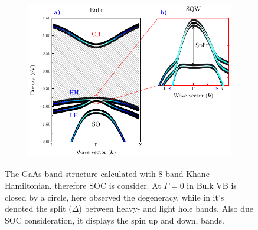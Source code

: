 \begin{figure}[h!]
	\centering
	\begin{subfigure}{\textwidth}
		\includegraphics[width=\linewidth]{../figures/chapter-2/numerical-calculations/out/kp-bands}
		\label{subfig:chapter-2-sec-numerical-calculations-kp-bands-bulk-a}
		\label{subfig:chapter-2-sec-numerical-calculations-kp-bands-sqw-b}
	\end{subfigure}
	\caption[ The GaAs band structure calculated with 8-band Khane Hamiltonian\cite{kane1957bandstructure,novik2005bandstructure}]
	{
	 The GaAs band structure calculated with 8-band Khane Hamiltonian\cite{kane1957bandstructure,novik2005bandstructure}, therefore SOC is consider. At $\Gamma = 0$ in Bulk VB is closed by a circle, here observed the degeneracy, while in  it's denoted the split ($\Delta$) between heavy- and light hole bands. Also due SOC consideration, it displays the spin up and down, bands. 
	}\label{fig:chapter-2-sec-numerical-calculations-kp-bands}
\end{figure}


